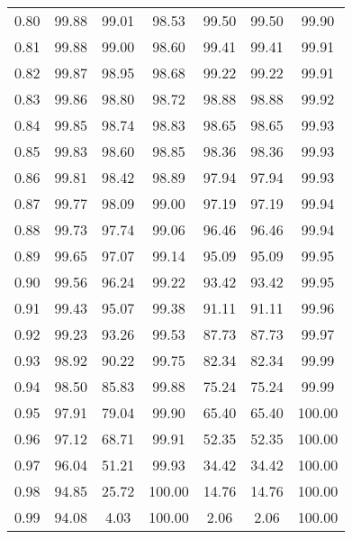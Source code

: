 \begin{tabular}{|c|c|c|c|c|c|c|}
      0.80 &     99.88 &     99.01 &      98.53 &   99.50 &      99.50 &         99.90 \\
      0.81 &     99.88 &     99.00 &      98.60 &   99.41 &      99.41 &         99.91 \\
      0.82 &     99.87 &     98.95 &      98.68 &   99.22 &      99.22 &         99.91 \\
      0.83 &     99.86 &     98.80 &      98.72 &   98.88 &      98.88 &         99.92 \\
      0.84 &     99.85 &     98.74 &      98.83 &   98.65 &      98.65 &         99.93 \\
      0.85 &     99.83 &     98.60 &      98.85 &   98.36 &      98.36 &         99.93 \\
      0.86 &     99.81 &     98.42 &      98.89 &   97.94 &      97.94 &         99.93 \\
      0.87 &     99.77 &     98.09 &      99.00 &   97.19 &      97.19 &         99.94 \\
      0.88 &     99.73 &     97.74 &      99.06 &   96.46 &      96.46 &         99.94 \\
      0.89 &     99.65 &     97.07 &      99.14 &   95.09 &      95.09 &         99.95 \\
      0.90 &     99.56 &     96.24 &      99.22 &   93.42 &      93.42 &         99.95 \\
      0.91 &     99.43 &     95.07 &      99.38 &   91.11 &      91.11 &         99.96 \\
      0.92 &     99.23 &     93.26 &      99.53 &   87.73 &      87.73 &         99.97 \\
      0.93 &     98.92 &     90.22 &      99.75 &   82.34 &      82.34 &         99.99 \\
      0.94 &     98.50 &     85.83 &      99.88 &   75.24 &      75.24 &         99.99 \\
      0.95 &     97.91 &     79.04 &      99.90 &   65.40 &      65.40 &        100.00 \\
      0.96 &     97.12 &     68.71 &      99.91 &   52.35 &      52.35 &        100.00 \\
      0.97 &     96.04 &     51.21 &      99.93 &   34.42 &      34.42 &        100.00 \\
      0.98 &     94.85 &     25.72 &     100.00 &   14.76 &      14.76 &        100.00 \\
      0.99 &     94.08 &      4.03 &     100.00 &    2.06 &       2.06 &        100.00 \\
\bottomrule
\end{tabular}
